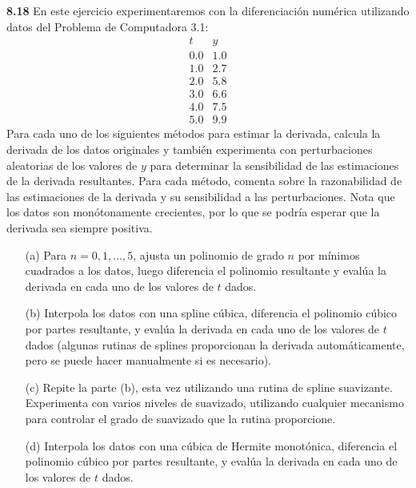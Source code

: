 \documentclass{article}
\begin{document}
\textbf{8.18} En este ejercicio experimentaremos con la diferenciación numérica utilizando datos del Problema de Computadora 3.1:
\[
\begin{array}{c|c}
t & y \\
\hline
0.0 & 1.0 \\
1.0 & 2.7 \\
2.0 & 5.8 \\
3.0 & 6.6 \\
4.0 & 7.5 \\
5.0 & 9.9
\end{array}
\]
Para cada uno de los siguientes métodos para estimar la derivada, calcula la derivada de los datos originales y también experimenta con perturbaciones aleatorias de los valores de \(y\) para determinar la sensibilidad de las estimaciones de la derivada resultantes. Para cada método, comenta sobre la razonabilidad de las estimaciones de la derivada y su sensibilidad a las perturbaciones. Nota que los datos son monótonamente crecientes, por lo que se podría esperar que la derivada sea siempre positiva.
\begin{itemize}
    \item[(a)] Para \(n = 0, 1, \dots, 5\), ajusta un polinomio de grado \(n\) por mínimos cuadrados a los datos, luego diferencia el polinomio resultante y evalúa la derivada en cada uno de los valores de \(t\) dados.
    
    \item[(b)] Interpola los datos con una spline cúbica, diferencia el polinomio cúbico por partes resultante, y evalúa la derivada en cada uno de los valores de \(t\) dados (algunas rutinas de splines proporcionan la derivada automáticamente, pero se puede hacer manualmente si es necesario).
    
    \item[(c)] Repite la parte (b), esta vez utilizando una rutina de spline suavizante. Experimenta con varios niveles de suavizado, utilizando cualquier mecanismo para controlar el grado de suavizado que la rutina proporcione.
    
    \item[(d)] Interpola los datos con una cúbica de Hermite monotónica, diferencia el polinomio cúbico por partes resultante, y evalúa la derivada en cada uno de los valores de \(t\) dados.
\end{itemize}
\end{document}
